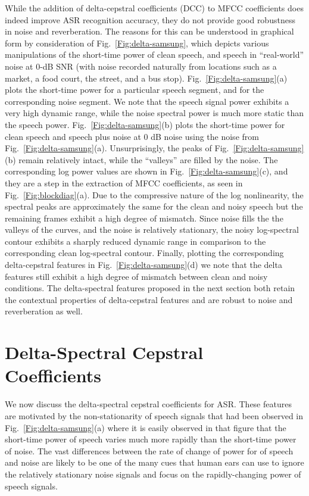 \documentclass{article}
\begin{document}
While the addition of delta-cepstral coefficients (DCC) to MFCC coefficients does indeed improve ASR recognition accuracy, they do not provide good robustness in noise and reverberation.    The reasons for this can be understood in graphical form by consideration of Fig.~\ref{Fig:delta-samsung}, which depicts various manipulations of the short-time power of clean speech, and speech in  ``real-world'' noise at 0-dB SNR (with noise recorded naturally from locations such as a market, a food court, the street, and a bus stop). Fig.~\ref{Fig:delta-samsung}(a) plots the short-time power for a particular speech segment, and for the corresponding noise segment. We note that the speech  signal power exhibits a very high dynamic range, while the noise spectral power is much more  static than the speech power. Fig.~\ref{Fig:delta-samsung}(b) plots the short-time power for clean speech and speech plus noise at 0 dB noise using the noise from Fig.~\ref{Fig:delta-samsung}(a). Unsurprisingly,  the peaks of Fig.~\ref{Fig:delta-samsung}(b) remain relatively intact, while the  ``valleys'' are filled by the noise. The corresponding log power values  are shown in Fig.~\ref{Fig:delta-samsung}(c), and they are a step in the extraction of MFCC coefficients, as seen in
Fig.~\ref{Fig:blockdiag}(a).  Due to the compressive nature of the log nonlinearity, the spectral peaks are approximately the same for the clean and noisy speech but the remaining frames exhibit a high degree of mismatch. Since noise fills the the   valleys of the curves, and the noise is relatively stationary, the noisy log-spectral contour exhibits a sharply reduced dynamic range in comparison to the corresponding clean log-spectral contour. Finally, plotting the corresponding  delta-cepstral
features in Fig.~\ref{Fig:delta-samsung}(d) we note that the delta features still exhibit a high degree of mismatch between clean and noisy conditions. The delta-spectral features proposed in the next section both retain the contextual properties of delta-cepstral features and   are   robust to noise and reverberation as well.

\section{Delta-Spectral Cepstral Coefficients}\label{sec:DSCC}
We now discuss the delta-spectral cepstral coefficients for ASR. These features are motivated by the non-stationarity of  speech signals that had been observed in Fig.~\ref{Fig:delta-samsung}(a) where it is easily observed in that figure that the short-time power of speech varies much more rapidly than the short-time power of noise.    The vast differences between the rate of change of  power for of speech and noise are likely to be one of the many cues that  human ears can use to ignore the relatively stationary noise signals and focus on  the rapidly-changing power of speech signals.
\end{document}
